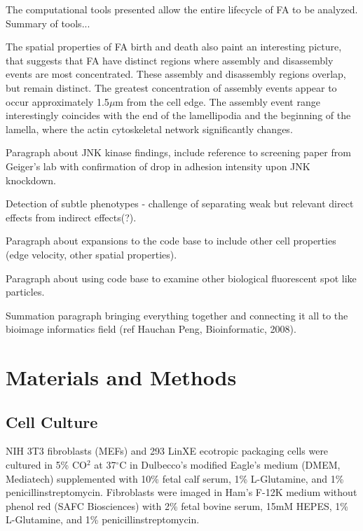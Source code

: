 \documentclass[10pt]{article}
\begin{document}
The computational tools presented allow the entire lifecycle of FA to be
analyzed. Summary of tools...

The spatial properties of FA birth and death also paint an interesting picture,
that suggests that FA have distinct regions where assembly and disassembly
events are most concentrated. These assembly and disassembly regions overlap,
but remain distinct. The greatest concentration of assembly events appear to
occur approximately 1.5$\mu$m from the cell edge. The assembly event range
interestingly coincides with the end of the lamellipodia and the beginning of
the lamella, where the actin cytoskeletal network significantly changes. 

Paragraph about JNK kinase findings, include reference to screening paper from
Geiger's lab with confirmation of drop in adhesion intensity upon JNK
knockdown.


Detection of subtle phenotypes - challenge of separating weak but relevant
direct effects from indirect effects(?). 

Paragraph about expansions to the code base to include other cell properties
(edge velocity, other spatial properties).

Paragraph about using code base to examine other biological fluorescent spot
like particles.

Summation paragraph bringing everything together and connecting it all to the
bioimage informatics field (ref Hauchan Peng, Bioinformatic, 2008). 



\section*{Materials and Methods}

\subsection*{Cell Culture}

NIH 3T3 fibroblasts (MEFs) and 293 LinXE ecotropic packaging cells were cultured
in 5\% CO$^2$ at 37$^\circ$C in Dulbecco's modified Eagle's medium (DMEM, Mediatech)
supplemented with 10\% fetal calf serum, 1\% L-Glutamine, and 1\%
penicillinstreptomycin. Fibroblasts were imaged in Ham's F-12K medium without
phenol red (SAFC Biosciences) with 2\% fetal bovine serum, 15mM HEPES, 1\%
L-Glutamine, and 1\% penicillinstreptomycin. 
\end{document}

